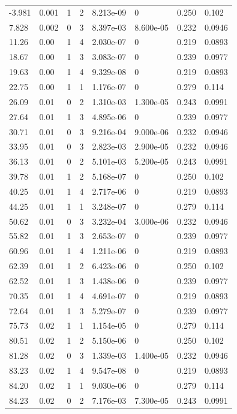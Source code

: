 \documentclass[preview]{standalone}
\begin{document}
{{\begin{tabular}{L{1.2cm}C{1.2cm} C{0.3cm}C{0.5cm} C{1.4cm}C{1.4cm} C{1.4cm}C{1.4cm}}
  -3.981  &  0.001  & 1     &  2 &  8.213e-09  & 0  & 0.250 &  0.102   \\ 
  7.828  &  0.002  & 0     &  3 &  8.397e-03  & 8.600e-05  & 0.232 &  0.0946   \\ 
  11.26  &  0.00  & 1     &  4 &  2.030e-07  & 0  & 0.219 &  0.0893   \\ 
  18.67  &  0.00  & 1     &  3 &  3.083e-07  & 0  & 0.239 &  0.0977   \\ 
  19.63  &  0.00  & 1     &  4 &  9.329e-08  & 0  & 0.219 &  0.0893   \\ 
  22.75  &  0.00  & 1     &  1 &  1.176e-07  & 0  & 0.279 &  0.114   \\ 
  26.09  &  0.01  & 0     &  2 &  1.310e-03  & 1.300e-05  & 0.243 &  0.0991   \\ 
  27.64  &  0.01  & 1     &  3 &  4.895e-06  & 0  & 0.239 &  0.0977   \\ 
  30.71  &  0.01  & 0     &  3 &  9.216e-04  & 9.000e-06  & 0.232 &  0.0946   \\ 
  33.95  &  0.01  & 0     &  3 &  2.823e-03  & 2.900e-05  & 0.232 &  0.0946   \\ 
  36.13  &  0.01  & 0     &  2 &  5.101e-03  & 5.200e-05  & 0.243 &  0.0991   \\ 
  39.78  &  0.01  & 1     &  2 &  5.168e-07  & 0  & 0.250 &  0.102   \\ 
  40.25  &  0.01  & 1     &  4 &  2.717e-06  & 0  & 0.219 &  0.0893   \\ 
  44.25  &  0.01  & 1     &  1 &  3.248e-07  & 0  & 0.279 &  0.114   \\ 
  50.62  &  0.01  & 0     &  3 &  3.232e-04  & 3.000e-06  & 0.232 &  0.0946   \\ 
  55.82  &  0.01  & 1     &  3 &  2.653e-07  & 0  & 0.239 &  0.0977   \\ 
  60.96  &  0.01  & 1     &  4 &  1.211e-06  & 0  & 0.219 &  0.0893   \\ 
  62.39  &  0.01  & 1     &  2 &  6.423e-06  & 0  & 0.250 &  0.102   \\ 
  62.52  &  0.01  & 1     &  3 &  1.438e-06  & 0  & 0.239 &  0.0977   \\ 
  70.35  &  0.01  & 1     &  4 &  4.691e-07  & 0  & 0.219 &  0.0893   \\ 
  72.64  &  0.01  & 1     &  3 &  5.279e-07  & 0  & 0.239 &  0.0977   \\ 
  75.73  &  0.02  & 1     &  1 &  1.154e-05  & 0  & 0.279 &  0.114   \\ 
  80.51  &  0.02  & 1     &  2 &  5.150e-06  & 0  & 0.250 &  0.102   \\ 
  81.28  &  0.02  & 0     &  3 &  1.339e-03  & 1.400e-05  & 0.232 &  0.0946   \\ 
  83.23  &  0.02  & 1     &  4 &  9.547e-08  & 0  & 0.219 &  0.0893   \\ 
  84.20  &  0.02  & 1     &  1 &  9.030e-06  & 0  & 0.279 &  0.114   \\ 
  84.23  &  0.02  & 0     &  2 &  7.176e-03  & 7.300e-05  & 0.243 &  0.0991   \\ 
\hline 
\end{tabular} 

}}
\end{document}
